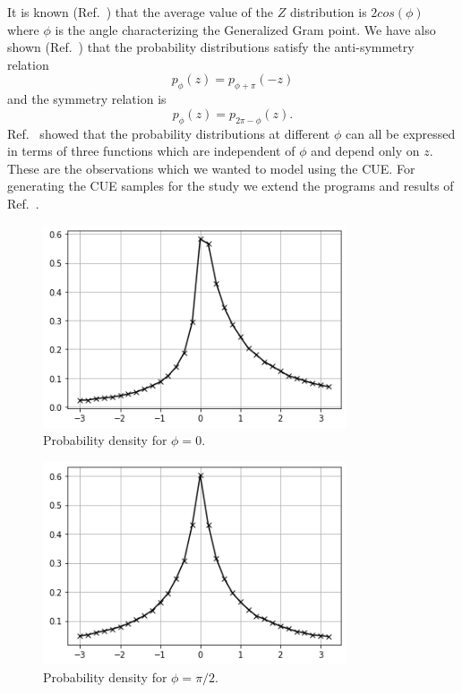 \documentclass[twoside]{article}
\begin{document}
It is known (Ref.~\cite{Shanker 2018b}) that the average value of the 
$Z$ distribution is $2cos(\phi)$ where $\phi$
is the angle characterizing the Generalized Gram point. We have also shown
(Ref.~\cite{Shanker 2020}) that the probability distributions
satisfy the anti-symmetry relation 
\begin{equation}
p_{\phi}(z) = p_{\phi+\pi}(-z)
\label{eq:Rieantisym}
\end{equation}
and the symmetry relation is
\begin{equation}
p_{\phi}(z) = p_{2\pi-\phi}(z).
\label{eq:Riesym}
\end{equation}
Ref.~\cite{Shanker 2020} showed 
that the probability distributions at different $\phi$ can all be expressed in
terms of three functions which are independent of $\phi$ and depend only on $z$.
These are the observations which we wanted to model using the CUE. For generating the
CUE samples for the study we extend the programs and results of Ref.~\cite{Francesco 2007}.

\begin{figure}
\centering
\includegraphics[width=0.8\textwidth]{1.png}
\caption[]{ 
  Probability density  for $\phi = 0$. 
  }
\vspace{1mm}
\label{z1}
\end{figure}

\begin{figure}
\centering
\includegraphics[width=0.8\textwidth]{2.png}
\caption[]{ 
  Probability density  for $\phi = \pi/2$. 
  }
\vspace{1mm}
\label{z2}
\end{figure}
\end{document}
